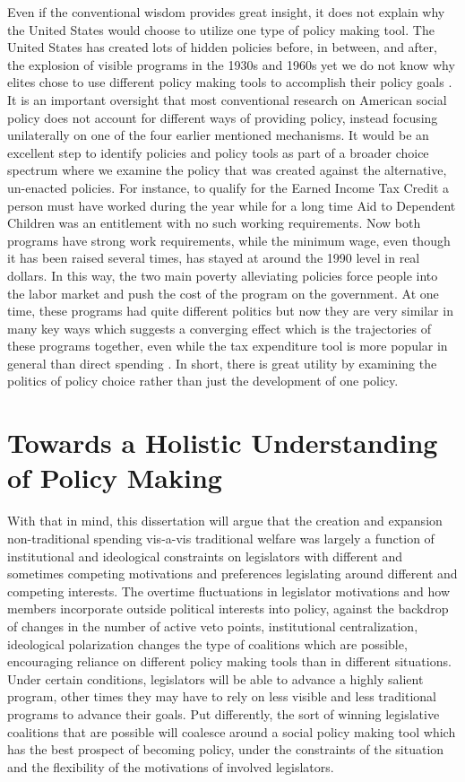 \documentclass[12pt]{article}
\begin{document}
Even if the conventional wisdom provides great insight, it does not explain why the United States would choose to utilize one type of policy making tool. The United States has created lots of hidden policies before, in between, and after, the explosion of visible programs in the 1930s and 1960s yet we do not know why elites chose to use different policy making tools to accomplish their policy goals \citep[Ch. 2]{howard2008}. It is an important oversight that most conventional research on American social policy does not account for different ways of providing policy, instead focusing unilaterally on one of the four earlier mentioned mechanisms. It would be an excellent step to identify policies and policy tools as part of a broader choice spectrum where we examine the policy that was created against the alternative, un-enacted policies. For instance, to qualify for the Earned Income Tax Credit a person must have worked during the year while for a long time Aid to Dependent Children was an entitlement with no such working requirements. Now both programs have strong work requirements, while the minimum wage, even though it has been raised several times, has stayed at around the 1990 level in real dollars. In this way, the two main poverty alleviating policies force people into the labor market and push the cost of the program on the government. At one time, these programs had quite different politics but now they are very similar in many key ways which suggests a converging effect which is the trajectories of these programs together, even while the tax expenditure tool is more popular in general than direct spending \citep{faricy2014}. In short, there is great utility by examining the politics of policy choice rather than just the development of one policy.


\section{Towards a Holistic Understanding of Policy Making}
With that in mind, this dissertation will argue that the creation and expansion non-traditional spending vis-a-vis traditional welfare was largely a function of institutional and ideological constraints on legislators with different and sometimes competing motivations and preferences legislating around different and competing interests. The overtime fluctuations in legislator motivations and how members incorporate outside political interests into policy, against the backdrop of changes in the number of active veto points, institutional centralization, ideological polarization changes the type of coalitions which are possible, encouraging reliance on different policy making tools than in different situations. Under certain conditions, legislators will be able to advance a highly salient program, other times they may have to rely on less visible and less traditional programs to advance their goals. Put differently, the sort of winning legislative coalitions that are possible will coalesce around a social policy making tool which has the best prospect of becoming policy, under the constraints of the situation and the flexibility of the motivations of involved legislators.
\end{document}
